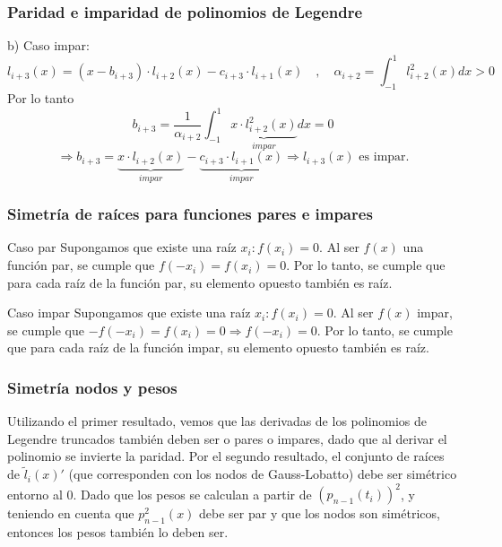 \documentclass{beamer}
\begin{document}

\begin{frame}
\frametitle{Paridad e imparidad de polinomios de Legendre}
b) Caso impar:
\[l_{i+3}(x)=(x-b_{i+3})\cdot l_{i+2}(x)-c_{i+3}\cdot l_{i+1}(x)\quad,\quad\alpha_{i+2}=\int_{-1}^1l_{i+2}^2(x)dx>0\] 
Por lo tanto \[b_{i+3}=\frac{1}{\alpha_{i+2}}\int_{-1}^1\underbrace{x\cdot l_{i+2}^2(x)}_{impar}dx=0\]
\[\Rightarrow b_{i+3}=\underbrace{x\cdot l_{i+2}(x)}_{impar}-\underbrace{c_{i+3}\cdot l_{i+1}(x)}_{impar}\Rightarrow l_{i+3}(x)\text{ es impar.}\]
\end{frame}


\begin{frame} 
\frametitle{Simetría de raíces para funciones pares e impares}
\begin{block}{Caso par} 
Supongamos que existe una raíz $x_i:f(x_i)=0$. Al ser $f(x)$ una función par, se cumple que $f(-x_i)=f(x_i)=0$. Por lo tanto, se cumple que para cada raíz de la función par, su elemento opuesto también es raíz.
\end{block}
\begin{block}{Caso impar} 
Supongamos que existe una raíz $x_i:f(x_i)=0$. Al ser $f(x)$ impar, se cumple que $-f(-x_i)=f(x_i)=0\Rightarrow f(-x_i)=0$. Por lo tanto, se cumple que para cada raíz de la función impar, su elemento opuesto también es raíz.
\end{block}
\end{frame}


\begin{frame}
\frametitle{Simetría nodos y pesos}
Utilizando el primer resultado, vemos que las derivadas de los polinomios de Legendre truncados también deben ser o pares o impares, dado que al derivar el polinomio se invierte la paridad. Por el segundo resultado, el conjunto de raíces de $\tilde l_i(x)'$ (que corresponden con los nodos de Gauss-Lobatto) debe ser simétrico entorno al 0. Dado que los pesos se calculan a partir de $(p_{n-1}(t_i))^2$, y teniendo en cuenta que $p_{n-1}^2(x)$ debe ser par y que los nodos son simétricos, entonces los pesos también lo deben ser. 
\end{frame}


\end{document}
